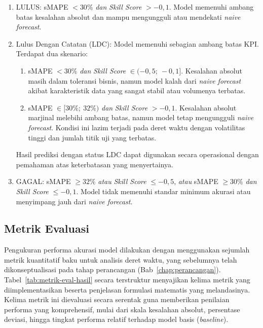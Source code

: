 \begin{enumerate}
    \item LULUS: sMAPE $< 30\%$ \textit{dan} \textit{Skill Score} $> -0{,}1$. Model memenuhi ambang batas kesalahan absolut dan mampu mengungguli atau mendekati \textit{naive forecast}.
    \item Lulus Dengan Catatan (LDC): Model memenuhi sebagian ambang batas KPI. Terdapat dua skenario:
    \begin{enumerate}
        \item[(a)] sMAPE $< 30\%$ \textit{dan} \textit{Skill Score} $\in (-0{,}5;\ -0{,}1]$. Kesalahan absolut masih dalam toleransi bisnis, namun model kalah dari \textit{naive forecast} akibat karakteristik data yang sangat stabil atau volumenya terbatas.
        \item[(b)] sMAPE $\in [30\%;\ 32\%)$ \textit{dan} \textit{Skill Score} $> -0{,}1$. Kesalahan absolut marjinal melebihi ambang batas, namun model tetap mengungguli \textit{naive forecast}. Kondisi ini lazim terjadi pada deret waktu dengan volatilitas tinggi dan jumlah titik uji yang terbatas.
    \end{enumerate}
    Hasil prediksi dengan status LDC dapat digunakan secara operasional dengan pemahaman atas keterbatasan yang menyertainya.
    \item GAGAL: sMAPE $\geq 32\%$ \textit{atau} \textit{Skill Score} $\leq -0{,}5$, \textit{atau} sMAPE $\geq 30\%$ \textit{dan} \textit{Skill Score} $\leq -0{,}1$. Model tidak memenuhi standar minimum akurasi atau menyimpang jauh dari \textit{naive forecast}.
\end{enumerate}

\subsection{Metrik Evaluasi}

Pengukuran performa akurasi model dilakukan dengan menggunakan sejumlah metrik kuantitatif baku untuk analisis deret waktu, yang sebelumnya telah dikonseptualisasi pada tahap perancangan (Bab~\ref{chap:perancangan}). Tabel~\ref{tab:metrik-eval-hasil} secara terstruktur menyajikan kelima metrik yang diimplementasikan beserta penjelasan formulasi matematis yang melandasinya. Kelima metrik ini dievaluasi secara serentak guna memberikan penilaian performa yang komprehensif, mulai dari skala kesalahan absolut, persentase deviasi, hingga tingkat performa relatif terhadap model basis (\textit{baseline}).


